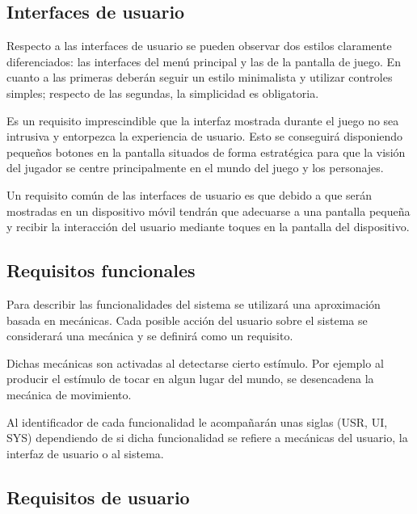 \subsection{Interfaces de usuario}

Respecto a las interfaces de usuario se pueden observar dos estilos claramente diferenciados: las interfaces del menú principal y las de la pantalla de juego. En cuanto a las primeras deberán seguir un estilo minimalista y utilizar controles simples; respecto de las segundas, la simplicidad es obligatoria.

Es un requisito imprescindible que la interfaz mostrada durante el juego no sea intrusiva y entorpezca la experiencia de usuario. Esto se conseguirá disponiendo pequeños botones en la pantalla situados de forma estratégica para que la visión del jugador se centre principalmente en el mundo del juego y los personajes.

Un requisito común de las interfaces de usuario es que debido a que serán mostradas en un dispositivo móvil tendrán que adecuarse a una pantalla pequeña y recibir la interacción del usuario mediante toques en la pantalla del dispositivo.

\subsection{Requisitos funcionales}

Para describir las funcionalidades del sistema se utilizará una aproximación basada en mecánicas. Cada posible acción del usuario sobre el sistema se considerará una mecánica y se definirá como un requisito. 

Dichas mecánicas son activadas al detectarse cierto estímulo. Por ejemplo al producir el estímulo de tocar en algun lugar del mundo, se desencadena la mecánica de movimiento.

Al identificador de cada funcionalidad le acompañarán unas siglas (USR, UI, SYS) dependiendo de si dicha funcionalidad se refiere a mecánicas del usuario, la interfaz de usuario o al sistema.

\subsection{Requisitos de usuario}

